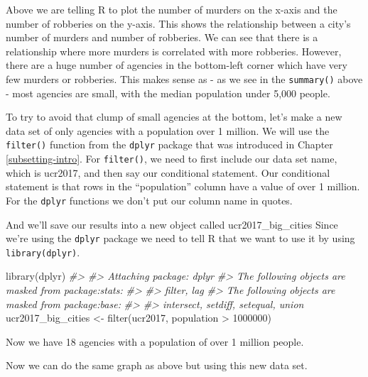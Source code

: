 \documentclass[
]{krantz}
\makeatletter
\newenvironment{Shaded}{\begin{snugshade}}{\end{snugshade}}
\newcommand{\CommentTok}[1]{\textcolor[rgb]{0.37,0.37,0.37}{\textit{#1}}}
\newcommand{\DecValTok}[1]{\textcolor[rgb]{0.06,0.06,0.06}{#1}}
\newcommand{\FunctionTok}[1]{\textcolor[rgb]{0,0,0}{#1}}
\newcommand{\NormalTok}[1]{#1}
\newcommand{\OtherTok}[1]{\textcolor[rgb]{0.37,0.37,0.37}{#1}}
\newcommand{\SpecialCharTok}[1]{\textcolor[rgb]{0,0,0}{#1}}
\newenvironment{kframe}{%
\medskip{}
\setlength{\fboxsep}{.8em}
 \def\at@end@of@kframe{}%
 \ifinner\ifhmode%
  \def\at@end@of@kframe{\end{minipage}}%
  \begin{minipage}{\columnwidth}%
 \fi\fi%
 \def\FrameCommand##1{\hskip\@totalleftmargin \hskip-\fboxsep
 \colorbox{shadecolor}{##1}\hskip-\fboxsep
     \hskip-\linewidth \hskip-\@totalleftmargin \hskip\columnwidth}%
 \MakeFramed {\advance\hsize-\width
   \@totalleftmargin\z@ \linewidth\hsize
   \@setminipage}}%
 {\par\unskip\endMakeFramed%
 \at@end@of@kframe}
\renewenvironment{Shaded}{\begin{kframe}}{\end{kframe}}
\makeatother
\begin{document}
Above we are telling R to plot the number of murders on the x-axis and the number of robberies on the y-axis. This shows the relationship between a city's number of murders and number of robberies. We can see that there is a relationship where more murders is correlated with more robberies. However, there are a huge number of agencies in the bottom-left corner which have very few murders or robberies. This makes sense as - as we see in the \texttt{summary()} above - most agencies are small, with the median population under 5,000 people.

To try to avoid that clump of small agencies at the bottom, let's make a new data set of only agencies with a population over 1 million. We will use the \texttt{filter()} function from the \texttt{dplyr} package that was introduced in Chapter \ref{subsetting-intro}. For \texttt{filter()}, we need to first include our data set name, which is ucr2017, and then say our conditional statement. Our conditional statement is that rows in the ``population'' column have a value of over 1 million. For the \texttt{dplyr} functions we don't put our column name in quotes.

And we'll save our results into a new object called ucr2017\_big\_cities Since we're using the \texttt{dplyr} package we need to tell R that we want to use it by using \texttt{library(dplyr)}.

\begin{Shaded}
\begin{Highlighting}[]
\FunctionTok{library}\NormalTok{(dplyr)}
\CommentTok{\#\textgreater{} }
\CommentTok{\#\textgreater{} Attaching package: \textquotesingle{}dplyr\textquotesingle{}}
\CommentTok{\#\textgreater{} The following objects are masked from \textquotesingle{}package:stats\textquotesingle{}:}
\CommentTok{\#\textgreater{} }
\CommentTok{\#\textgreater{}     filter, lag}
\CommentTok{\#\textgreater{} The following objects are masked from \textquotesingle{}package:base\textquotesingle{}:}
\CommentTok{\#\textgreater{} }
\CommentTok{\#\textgreater{}     intersect, setdiff, setequal, union}
\NormalTok{ucr2017\_big\_cities }\OtherTok{\textless{}{-}} \FunctionTok{filter}\NormalTok{(ucr2017, population }\SpecialCharTok{\textgreater{}} \DecValTok{1000000}\NormalTok{) }
\end{Highlighting}
\end{Shaded}

Now we have 18 agencies with a population of over 1 million people.

Now we can do the same graph as above but using this new data set.
\end{document}
